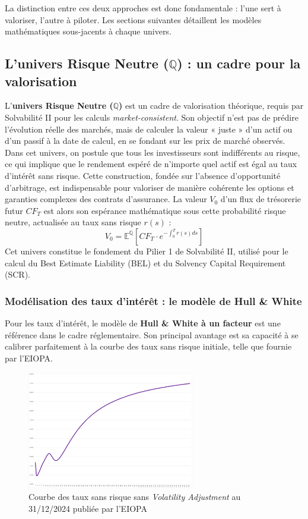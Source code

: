 La distinction entre ces deux approches est donc fondamentale : l'une sert à valoriser, l'autre à piloter. Les sections suivantes détaillent les modèles mathématiques sous-jacents à chaque univers.

\subsection{\texorpdfstring{L'univers Risque Neutre ($\mathbb{Q}$)}{L'univers Risque Neutre (Q)} : un cadre pour la valorisation}

L'\textbf{univers Risque Neutre ($\mathbb{Q}$)} est un cadre de valorisation théorique, requis par Solvabilité II pour les calculs \textit{market-consistent}. Son objectif n'est pas de prédire l'évolution réelle des marchés, mais de calculer la valeur « juste » d'un actif ou d'un passif à la date de calcul, en se fondant sur les prix de marché observés. Dans cet univers, on postule que tous les investisseurs sont indifférents au risque, ce qui implique que le rendement espéré de n'importe quel actif est égal au taux d'intérêt sans risque. Cette construction, fondée sur l'absence d'opportunité d'arbitrage, est indispensable pour valoriser de manière cohérente les options et garanties complexes des contrats d'assurance. La valeur $V_0$ d'un flux de trésorerie futur $CF_T$ est alors son espérance mathématique sous cette probabilité risque neutre, actualisée au taux sans risque $r(s)$ :
\begin{equation}
    V_0 = \mathbb{E}^{\mathbb{Q}} \left[ CF_T \cdot e^{-\int_0^T r(s)ds} \right]
    \label{eq:valeur_risque_neutre}
\end{equation}
Cet univers constitue le fondement du Pilier 1 de Solvabilité II, utilisé pour le calcul du Best Estimate Liability (BEL) et du Solvency Capital Requirement (SCR).

\subsubsection{Modélisation des taux d'intérêt : le modèle de Hull \& White}
Pour les taux d'intérêt, le modèle de \textbf{Hull \& White à un facteur} est une référence dans le cadre réglementaire. Son principal avantage est sa capacité à se calibrer parfaitement à la courbe des taux sans risque initiale, telle que fournie par l'EIOPA.
\begin{figure}[H]
    \centering
    \includegraphics[width=0.65\textwidth]{images/2_chapitres/chapitre1/courbe_EIOPA.png}
    \caption{Courbe des taux sans risque sans \textit{Volatility Adjustment} au 31/12/2024 publiée par l'EIOPA}
    \label{fig:courbe_EIOPA}
\end{figure}

